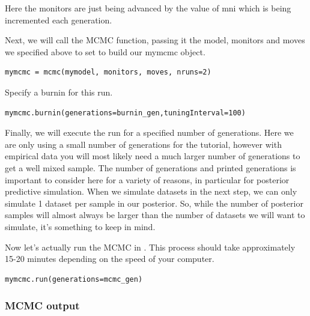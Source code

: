 Here the monitors are just being advanced by the value of mni which is being incremented each generation.

Next, we will call the MCMC function, passing it the model, monitors and moves we specified above to set 
to build our mymcmc object.
 
{\tt \begin{Snugshade}[184,207,236]
\begin{lstlisting}
mymcmc = mcmc(mymodel, monitors, moves, nruns=2)
\end{lstlisting}
\end{Snugshade}}

Specify a burnin for this run.

{\tt \begin{Snugshade}[184,207,236]
\begin{lstlisting}
mymcmc.burnin(generations=burnin_gen,tuningInterval=100)
\end{lstlisting}
\end{Snugshade}}

Finally, we will execute the run for a specified number of generations. Here we are only using a small
number of generations for the tutorial, however with empirical data you will most likely need a much
larger number of generations to get a well mixed sample. The number of generations and printed generations
is important to consider here for a variety of reasons, in particular for posterior predictive simulation.
When we simulate datasets in the next step, we can only simulate 1 dataset per sample in our posterior. So,
while the number of posterior samples will almost always be larger than the number of datasets we will want
to simulate, it's something to keep in mind.


Now let's actually run the MCMC in \RevBayes. 
This process should take approximately 15-20 minutes depending on the speed of your computer.

{\tt \begin{Snugshade}[184,207,236]
\begin{lstlisting}
mymcmc.run(generations=mcmc_gen)
\end{lstlisting}
\end{Snugshade}}

\subsubsection{MCMC output}

